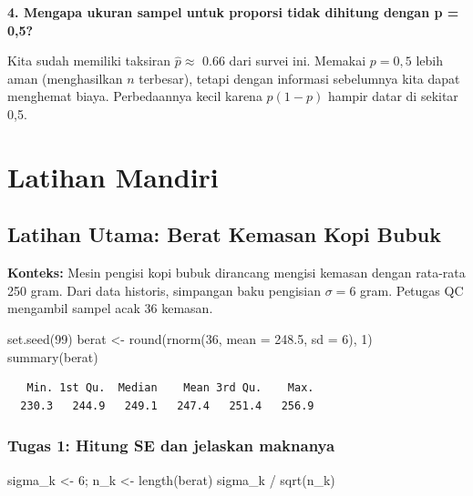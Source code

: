 \documentclass[
  indonesian,
  letterpaper,
]{book}
\newenvironment{Shaded}{\begin{snugshade}}{\end{snugshade}}
\newcommand{\AttributeTok}[1]{\textcolor[rgb]{0.40,0.45,0.13}{#1}}
\newcommand{\DecValTok}[1]{\textcolor[rgb]{0.68,0.00,0.00}{#1}}
\newcommand{\FloatTok}[1]{\textcolor[rgb]{0.68,0.00,0.00}{#1}}
\newcommand{\FunctionTok}[1]{\textcolor[rgb]{0.28,0.35,0.67}{#1}}
\newcommand{\NormalTok}[1]{\textcolor[rgb]{0.00,0.23,0.31}{#1}}
\newcommand{\OtherTok}[1]{\textcolor[rgb]{0.00,0.23,0.31}{#1}}
\newcommand{\SpecialCharTok}[1]{\textcolor[rgb]{0.37,0.37,0.37}{#1}}
\begin{document}
\textbf{4. Mengapa ukuran sampel untuk proporsi tidak dihitung dengan p
= 0,5?}

Kita sudah memiliki taksiran \(\hat{p} \approx\) 0.66 dari survei ini.
Memakai \(p = 0{,}5\) lebih aman (menghasilkan \(n\) terbesar), tetapi
dengan informasi sebelumnya kita dapat menghemat biaya. Perbedaannya
kecil karena \(p(1-p)\) hampir datar di sekitar 0,5.

\section{Latihan Mandiri}\label{latihan-mandiri}

\subsection{Latihan Utama: Berat Kemasan Kopi
Bubuk}\label{latihan-utama-berat-kemasan-kopi-bubuk}

\textbf{Konteks:} Mesin pengisi kopi bubuk dirancang mengisi kemasan
dengan rata-rata 250 gram. Dari data historis, simpangan baku pengisian
\(\sigma = 6\) gram. Petugas QC mengambil sampel acak 36 kemasan.

\begin{Shaded}
\begin{Highlighting}[]
\FunctionTok{set.seed}\NormalTok{(}\DecValTok{99}\NormalTok{)}
\NormalTok{berat }\OtherTok{\textless{}{-}} \FunctionTok{round}\NormalTok{(}\FunctionTok{rnorm}\NormalTok{(}\DecValTok{36}\NormalTok{, }\AttributeTok{mean =} \FloatTok{248.5}\NormalTok{, }\AttributeTok{sd =} \DecValTok{6}\NormalTok{), }\DecValTok{1}\NormalTok{)}
\FunctionTok{summary}\NormalTok{(berat)}
\end{Highlighting}
\end{Shaded}

\begin{verbatim}
   Min. 1st Qu.  Median    Mean 3rd Qu.    Max. 
  230.3   244.9   249.1   247.4   251.4   256.9 
\end{verbatim}

\subsubsection{Tugas 1: Hitung SE dan jelaskan
maknanya}\label{tugas-1-hitung-se-dan-jelaskan-maknanya}

\begin{Shaded}
\begin{Highlighting}[]
\NormalTok{sigma\_k }\OtherTok{\textless{}{-}} \DecValTok{6}\NormalTok{; n\_k }\OtherTok{\textless{}{-}} \FunctionTok{length}\NormalTok{(berat)}
\NormalTok{sigma\_k }\SpecialCharTok{/} \FunctionTok{sqrt}\NormalTok{(n\_k)}
\end{Highlighting}
\end{Shaded}
\end{document}
